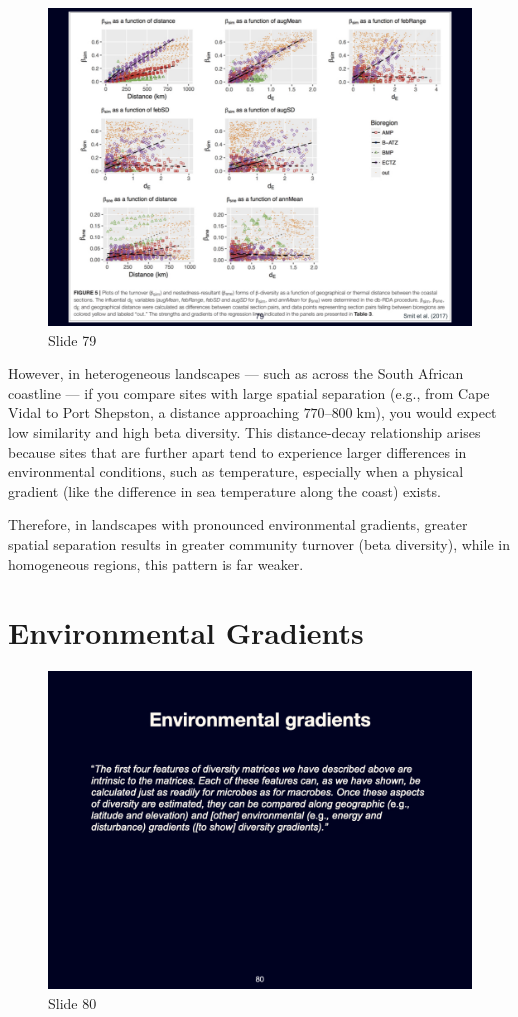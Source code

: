 \documentclass[
  12pt,
]{book}
\begin{document}
\begin{figure}[ht]
\centering
\includegraphics[width=0.8\linewidth]{../images/BDC334/BDC334-079.jpeg}
\caption*{Slide 79}
\end{figure}

However, in heterogeneous landscapes --- such as across the South
African coastline --- if you compare sites with large spatial separation
(e.g., from Cape Vidal to Port Shepston, a distance approaching
\(770\)--\(800\;\mathrm{km}\)), you would expect low similarity and high
beta diversity. This distance-decay relationship arises because sites
that are further apart tend to experience larger differences in
environmental conditions, such as temperature, especially when a
physical gradient (like the difference in sea temperature along the
coast) exists.

Therefore, in landscapes with pronounced environmental gradients,
greater spatial separation results in greater community turnover (beta
diversity), while in homogeneous regions, this pattern is far weaker.

\section{Environmental Gradients}\label{environmental-gradients-2}

\begin{figure}[ht]
\centering
\includegraphics[width=0.8\linewidth]{../images/BDC334/BDC334-080.jpeg}
\caption*{Slide 80}
\end{figure}
\end{document}
